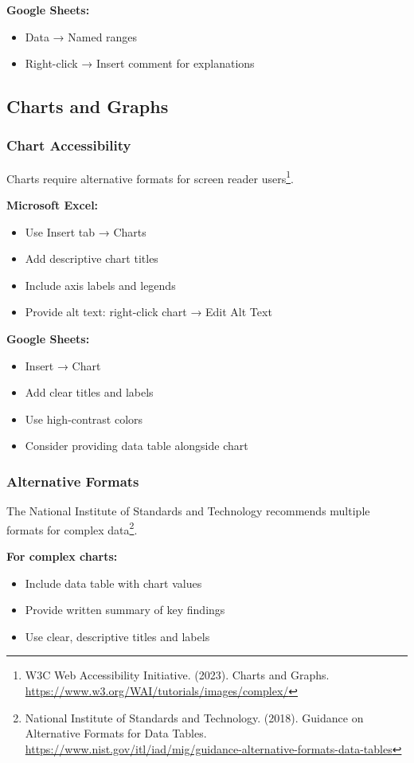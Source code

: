 \textbf{Google Sheets:}
\begin{itemize}
\item Data → Named ranges
\item Right-click → Insert comment for explanations
\end{itemize}

\subsection{Charts and Graphs}

\subsubsection{Chart Accessibility}
Charts require alternative formats for screen reader users\footnote{W3C Web Accessibility Initiative. (2023). Charts and Graphs. \url{https://www.w3.org/WAI/tutorials/images/complex/}}.

\textbf{Microsoft Excel:}
\begin{itemize}
\item Use Insert tab → Charts
\item Add descriptive chart titles
\item Include axis labels and legends
\item Provide alt text: right-click chart → Edit Alt Text
\end{itemize}

\textbf{Google Sheets:}
\begin{itemize}
\item Insert → Chart
\item Add clear titles and labels
\item Use high-contrast colors
\item Consider providing data table alongside chart
\end{itemize}

\subsubsection{Alternative Formats}
The National Institute of Standards and Technology recommends multiple formats for complex data\footnote{National Institute of Standards and Technology. (2018). Guidance on Alternative Formats for Data Tables. \url{https://www.nist.gov/itl/iad/mig/guidance-alternative-formats-data-tables}}.

\textbf{For complex charts:}
\begin{itemize}
\item Include data table with chart values
\item Provide written summary of key findings
\item Use clear, descriptive titles and labels
\end{itemize}


